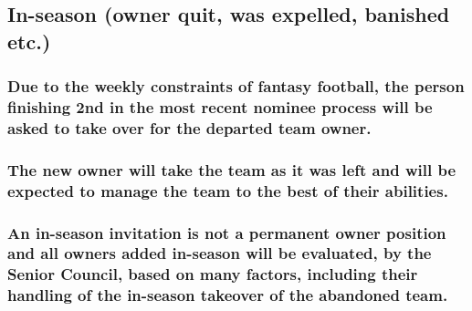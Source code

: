 \documentclass[
]{book}
\begin{document}
\hypertarget{in-season-owner-quit-was-expelled-banished-etc.}{%
\subsection{In-season (owner quit, was expelled, banished etc.)}\label{in-season-owner-quit-was-expelled-banished-etc.}}

\hypertarget{due-to-the-weekly-constraints-of-fantasy-football-the-person-finishing-2nd-in-the-most-recent-nominee-process-will-be-asked-to-take-over-for-the-departed-team-owner.}{%
\subsubsection{Due to the weekly constraints of fantasy football, the person finishing 2nd in the most recent nominee process will be asked to take over for the departed team owner.}\label{due-to-the-weekly-constraints-of-fantasy-football-the-person-finishing-2nd-in-the-most-recent-nominee-process-will-be-asked-to-take-over-for-the-departed-team-owner.}}

\hypertarget{the-new-owner-will-take-the-team-as-it-was-left-and-will-be-expected-to-manage-the-team-to-the-best-of-their-abilities.}{%
\subsubsection{The new owner will take the team as it was left and will be expected to manage the team to the best of their abilities.}\label{the-new-owner-will-take-the-team-as-it-was-left-and-will-be-expected-to-manage-the-team-to-the-best-of-their-abilities.}}

\hypertarget{an-in-season-invitation-is-not-a-permanent-owner-position-and-all-owners-added-in-season-will-be-evaluated-by-the-senior-council-based-on-many-factors-including-their-handling-of-the-in-season-takeover-of-the-abandoned-team.}{%
\subsubsection{An in-season invitation is not a permanent owner position and all owners added in-season will be evaluated, by the Senior Council, based on many factors, including their handling of the in-season takeover of the abandoned team.}\label{an-in-season-invitation-is-not-a-permanent-owner-position-and-all-owners-added-in-season-will-be-evaluated-by-the-senior-council-based-on-many-factors-including-their-handling-of-the-in-season-takeover-of-the-abandoned-team.}}
\end{document}

